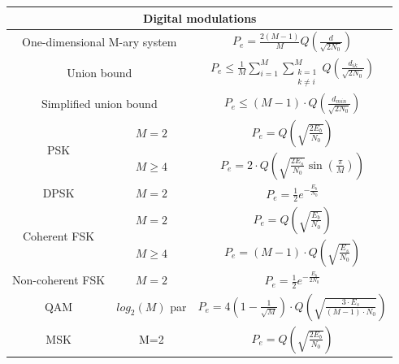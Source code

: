 \documentclass[en]{article}
\DeclareMathOperator{\sen}{sin}
\begin{document}
\begin{center}
    \renewcommand{\arraystretch}{2.2}
        \begin{tabular}{|c|c|c|}
            \multicolumn{3}{c}{{\bf Digital modulations}}\\
            \hline
            \multicolumn{2}{|c|}{One-dimensional M-ary system} & $P_e = \displaystyle\frac{2(M-1)}{M} Q \left ( \displaystyle\frac{d}{\sqrt{2 N_0}} \right ) $\\[1ex]
            \hline
            \multicolumn{2}{|c|}{Union bound} & $P_e \leq \displaystyle\frac{1}{M} \displaystyle\sum\limits_{i=1}^{M} \displaystyle\sum\limits_{\substack{k=1 \\ k\neq i}}^{M} Q \left ( \displaystyle\frac{d_{ik}}{\sqrt{2 N_0}} \right )$ \\ [1ex]
            \hline
            \multicolumn{2}{|c|}{Simplified union bound} & $P_e \leq (M-1) \cdot Q \left ( \displaystyle\frac{d_{min}}{\sqrt{2 N_0}} \right )$ \\[1ex]
            \hline
            \multirow{2}{*}{PSK} & $M=2$ & $P_e = Q\left ( \displaystyle\sqrt{\displaystyle\frac{2 E_b}{N_0}} \right)$ \\[1ex]
            \cline{2-3}
            & $M \geq 4$ & $P_e = 2 \cdot Q\left ( \sqrt{\displaystyle\frac{2 E_s}{N_0}} \sen\left ( \displaystyle\frac{\pi}{M} \right)  \right)$ \\
            \hline
            DPSK & $M=2$ & $P_e = \displaystyle\frac{1}{2} e^{-\displaystyle\frac{E_b}{N_0}}$ \\
            \hline
            \multirow{2}{*}{Coherent FSK} & $M=2$ & $P_e = Q\left ( \sqrt{\displaystyle\frac{E_b}{N_0}} \right)$ \\
            \cline{2-3}
            & $M\geq 4$ & $P_e = (M-1) \cdot Q\left ( \sqrt{\displaystyle\frac{E_s}{N_0}} \right)$ \\
            \hline
            Non-coherent FSK & $M=2$ & $P_e = \displaystyle\frac{1}{2} e^{-\displaystyle\frac{E_b}{2 N_0}}$ \\
            \hline
            QAM & $log_2(M)$ par & $P_e = 4 \left ( 1 - \displaystyle\frac{1}{\sqrt{M}} \right ) \cdot Q\left ( \sqrt{\displaystyle\frac{3 \cdot E_s}{(M-1) \cdot N_0}} \right)$ \\
            \hline
            MSK & M=2 & $P_e = Q\left ( \displaystyle\sqrt{\displaystyle\frac{2 E_b}{N_0}} \right)$ \\
            \hline
        \end{tabular}
        \renewcommand{\arraystretch}{1}
        \vspace{0.5cm}





\end{center}
\end{document}

